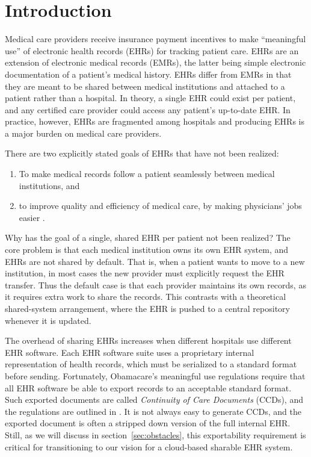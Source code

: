 \section{Introduction}\label{sec:introduction}
Medical care providers receive insurance payment incentives to make ``meaningful use'' of electronic health records (EHRs) for tracking patient care. EHRs are an extension of electronic medical records (EMRs), the latter being simple electronic documentation of a patient's medical history. EHRs differ from EMRs in that they are meant to be shared between medical institutions and attached to a patient rather than a hospital. In theory, a single EHR could exist per patient, and any certified care provider could access any patient's up-to-date EHR. In practice, however, EHRs are fragmented among hospitals and producing EHRs is a major burden on medical care providers.

There are two explicitly stated goals of EHRs that have not been realized:
\begin{enumerate}
	\item To make medical records follow a patient seamlessly between medical institutions, and
	\item to improve quality and efficiency of medical care, by making physicians' jobs easier \cite{Meaningful-Use}.
\end{enumerate}

Why has the goal of a single, shared EHR per patient not been realized? The core problem is that each medical institution owns its own EHR system, and EHRs are not shared by default. That is, when a patient wants to move to a new institution, in most cases the new provider must explicitly request the EHR transfer. Thus the default case is that each provider maintains its own records, as it requires extra work to share the records. This contrasts with a theoretical shared-system arrangement, where the EHR is pushed to a central repository whenever it is updated.

The overhead of sharing EHRs increases when different hospitals use different EHR software. Each EHR software suite uses a proprietary internal representation of health records, which must be serialized to a standard format before sending. Fortunately, Obamacare's meaningful use regulations require that all EHR software be able to export records to an acceptable standard format. Such exported documents are called \textit{Continuity of Care Documents} (CCDs), and the regulations are outlined in \cite{CCD}. It is not always easy to generate CCDs, and the exported document is often a stripped down version of the full internal EHR. Still, as we will discuss in section~\ref{sec:obstacles}, this exportability requirement is critical for transitioning to our vision for a cloud-based sharable EHR system.

